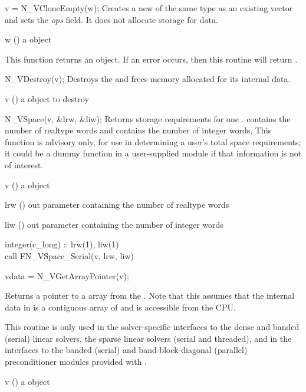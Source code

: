 {
  v = N\_VCloneEmpty(w);
}
{
  Creates a new  of the same type as an existing vector  and sets the
  {\em ops} field. It does not allocate storage for data.
}
{
  \begin{args}[w]
  \item[w] () a {\nvector} object
  \end{args}
}
{
  This function returns an  object. If an error occurs, then this
  routine will return .
}
{}

{
  N\_VDestroy(v);
}
{
  Destroys the   and frees memory allocated for its
  internal data.
}
{
  \begin{args}[v]
  \item[v] () a {\nvector} object to destroy
  \end{args}
}
{}
{}

{
  N\_VSpace(v, \&lrw, \&liw);
}
{
  Returns storage requirements for one .
   contains the number of realtype words and 
  contains the number of integer words, This function is advisory
  only, for use in determining a user's total space requirements;
  it could be a dummy function in a user-supplied
  {\nvector} module if that information is not of interest.
}
{
  \begin{args}[v]
  \item[v] () a {\nvector} object
  \item[lrw] () out parameter containing the number of realtype words
  \item[liw] () out parameter containing the number of integer words
  \end{args}
}
{}
{}
{
  integer(c\_long) :: lrw(1), liw(1)\\
  call FN\_VSpace\_Serial(v, lrw, liw)
}

{
  vdata = N\_VGetArrayPointer(v);
}
{
  Returns a pointer to a  array from the  .
  Note that this assumes that the internal data in  is
  a contiguous array of  and is accessible from the CPU.

  This routine is only used in the
  solver-specific interfaces to the dense and banded (serial) linear
  solvers, the sparse linear solvers (serial and threaded), and in the
  interfaces to the banded (serial) and band-block-diagonal (parallel)
  preconditioner modules provided with {\sundials}.
}
{
  \begin{args}[v]
  \item[v] () a {\nvector} object
  \end{args}
}
{
}
{}


